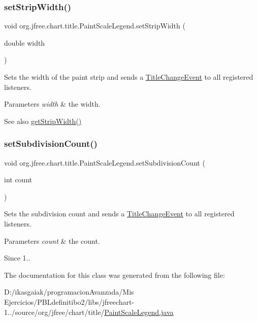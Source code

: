 \subsubsection{\texorpdfstring{set\+Strip\+Width()}{setStripWidth()}}
{\footnotesize\ttfamily void org.\+jfree.\+chart.\+title.\+Paint\+Scale\+Legend.\+set\+Strip\+Width (\begin{DoxyParamCaption}\item[{double}]{width }\end{DoxyParamCaption})}

Sets the width of the paint strip and sends a \mbox{\hyperlink{}{Title\+Change\+Event}} to all registered listeners.


\begin{DoxyParams}{Parameters}
{\em width} & the width.\\
\hline
\end{DoxyParams}
\begin{DoxySeeAlso}{See also}
\mbox{\hyperlink{classorg_1_1jfree_1_1chart_1_1title_1_1_paint_scale_legend_a4fa181b733f23975b9edfc1b50c864a8}{get\+Strip\+Width()}} 
\end{DoxySeeAlso}
\mbox{\label{classorg_1_1jfree_1_1chart_1_1title_1_1_paint_scale_legend_a0206fdb568b6dfc6a6c43ec5d874744c}} 
\subsubsection{\texorpdfstring{set\+Subdivision\+Count()}{setSubdivisionCount()}}
{\footnotesize\ttfamily void org.\+jfree.\+chart.\+title.\+Paint\+Scale\+Legend.\+set\+Subdivision\+Count (\begin{DoxyParamCaption}\item[{int}]{count }\end{DoxyParamCaption})}

Sets the subdivision count and sends a \mbox{\hyperlink{}{Title\+Change\+Event}} to all registered listeners.


\begin{DoxyParams}{Parameters}
{\em count} & the count.\\
\hline
\end{DoxyParams}
\begin{DoxySince}{Since}
1.. 
\end{DoxySince}


The documentation for this class was generated from the following file\+:\begin{DoxyCompactItemize}
\item 
D\+:/ikasgaiak/programacion\+Avanzada/\+Mis Ejercicios/\+P\+B\+Ldefinitibo2/libs/jfreechart-\/1../source/org/jfree/chart/title/\mbox{\hyperlink{_paint_scale_legend_8java}{Paint\+Scale\+Legend.\+java}}\end{DoxyCompactItemize}
